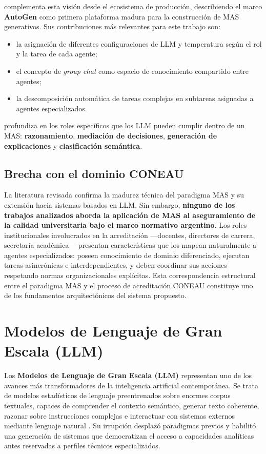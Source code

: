 \citet{bertelsmann_harnessing_multi_agent_2024} complementa esta visión desde el ecosistema de producción, describiendo el marco \textbf{AutoGen} \citep{wu2023autogen} como primera plataforma madura para la construcción de MAS generativos. Sus contribuciones más relevantes para este trabajo son: 
\begin{itemize}
    \item la asignación de diferentes configuraciones de LLM y temperatura según el rol y la tarea de cada agente;
    \item el concepto de \textit{group chat} como espacio de conocimiento compartido entre agentes;
    \item la descomposición automática de tareas complejas en subtareas asignadas a agentes especializados.
\end{itemize}

\citet{jimenez_romero_multi_agent_llm_2025} profundiza en los roles específicos que los LLM pueden cumplir dentro de un MAS: \textbf{razonamiento}, \textbf{mediación de decisiones}, \textbf{generación de explicaciones} y \textbf{clasificación semántica}.

\subsection{Brecha con el dominio CONEAU}

La literatura revisada confirma la madurez técnica del paradigma MAS y su extensión hacia sistemas basados en LLM. Sin embargo, \textbf{ninguno de los trabajos analizados aborda la aplicación de MAS al aseguramiento de la calidad universitaria bajo el marco normativo argentino}. Los roles institucionales involucrados en la acreditación ---docentes, directores de carrera, secretaría académica--- presentan características que los mapean naturalmente a agentes especializados: poseen conocimiento de dominio diferenciado, ejecutan tareas asincrónicas e interdependientes, y deben coordinar sus acciones respetando normas organizacionales explícitas. Esta correspondencia estructural entre el paradigma MAS y el proceso de acreditación CONEAU constituye uno de los fundamentos arquitectónicos del sistema propuesto.

\section{Modelos de Lenguaje de Gran Escala (LLM)}
\label{sec:eda_llm}

Los \textbf{Modelos de Lenguaje de Gran Escala (LLM)} representan uno de los avances más transformadores de la inteligencia artificial contemporánea. Se trata de modelos estadísticos de lenguaje preentrenados sobre enormes corpus textuales, capaces de comprender el contexto semántico, generar texto coherente, razonar sobre instrucciones complejas e interactuar con sistemas externos mediante lenguaje natural \citep{garcia2025desarrollo, farsane2025automatizacion}. Su irrupción desplazó paradigmas previos y habilitó una generación de sistemas que democratizan el acceso a capacidades analíticas antes reservadas a perfiles técnicos especializados.

